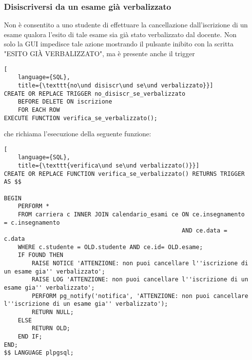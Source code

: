 \documentclass{article}
\newcommand{\und}[0]{\textunderscore}
\begin{document}
\subsubsection{Disiscriversi da un esame già verbalizzato}
Non è consentito a uno studente di effettuare la cancellazione dall'iscrizione di un esame qualora l'esito di tale esame sia già stato verbalizzato dal docente. Non solo la GUI impedisce tale azione mostrando il pulsante inibito con la scritta "ESITO GIÀ VERBALIZZATO", ma è presente anche il trigger


\begin{lstlisting}[
    language={SQL},
    title={\texttt{no\und disiscr\und se\und verbalizzato}}]
CREATE OR REPLACE TRIGGER no_disiscr_se_verbalizzato
    BEFORE DELETE ON iscrizione
    FOR EACH ROW
EXECUTE FUNCTION verifica_se_verbalizzato();
\end{lstlisting}

che richiama l'esecuzione della seguente funzione:

\begin{lstlisting}[
    language={SQL},
    title={\texttt{verifica\und se\und verbalizzato()}}]
CREATE OR REPLACE FUNCTION verifica_se_verbalizzato() RETURNS TRIGGER AS $$

BEGIN
    PERFORM *
    FROM carriera c INNER JOIN calendario_esami ce ON ce.insegnamento = c.insegnamento
                                                   AND ce.data = c.data
    WHERE c.studente = OLD.studente AND ce.id= OLD.esame;
    IF FOUND THEN
        RAISE NOTICE 'ATTENZIONE: non puoi cancellare l''iscrizione di un esame gia'' verbalizzato';
        RAISE LOG 'ATTENZIONE: non puoi cancellare l''iscrizione di un esame gia'' verbalizzato';
        PERFORM pg_notify('notifica', 'ATTENZIONE: non puoi cancellare l''iscrizione di un esame gia'' verbalizzato');
        RETURN NULL;
    ELSE
        RETURN OLD;
    END IF;
END;
$$ LANGUAGE plpgsql;
\end{lstlisting}


\pagebreak
\end{document}
